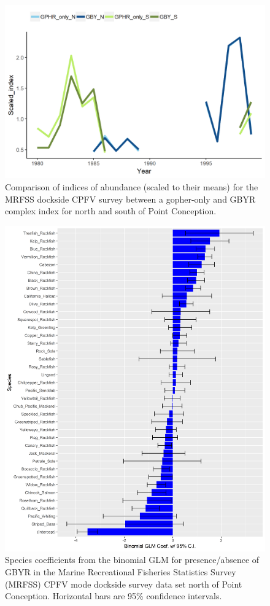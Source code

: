 \documentclass[12pt,]{article}
\begin{document}
\begin{figure}
\centering
\includegraphics{Figures/MRFSS_index_compare.png}
\caption{Comparison of indices of abundance (scaled to their means) for
the MRFSS dockside CPFV survey between a gopher-only and GBYR complex
index for north and south of Point Conception.
\label{fig:MRFSS_index_compare}}
\end{figure}

\begin{figure}
\centering
\includegraphics{Figures/Fleet10_SM_filter.png}
\caption{Species coefficients from the binomial GLM for presence/absence
of GBYR in the Marine Recreational Fisheries Statistics Survey (MRFSS)
CPFV mode dockside survey data set north of Point Conception. Horizontal
bars are 95\% confidence intervals. \label{fig:Fleet10_SM_filter}}
\end{figure}
\end{document}
